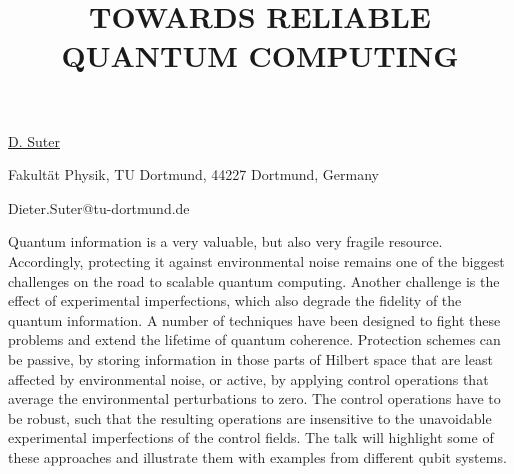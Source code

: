 \title{TOWARDS RELIABLE QUANTUM COMPUTING}

\underline{D. Suter} 

{\normalsize{\vspace{-4mm}
Fakult\"{a}t Physik,
TU Dortmund,
44227 Dortmund,
Germany

\email Dieter.Suter@tu-dortmund.de}}

Quantum information is a very valuable, but also very fragile resource.
Accordingly, protecting it against environmental noise remains one of the biggest challenges
on the road to scalable quantum computing. Another challenge is the effect of experimental
imperfections, which also degrade the fidelity of the quantum information.
A number of techniques have been designed to fight these problems and extend the lifetime of quantum coherence.
Protection schemes can be passive, by storing information in those parts of Hilbert space that are least affected
by environmental noise, or active, by applying control operations that average the environmental perturbations to
zero. The control operations have to be robust, such that the resulting operations are insensitive to the unavoidable
experimental imperfections of the control fields.
The talk will highlight some of these approaches and illustrate them with examples from different qubit systems.

\vspace{\baselineskip}

